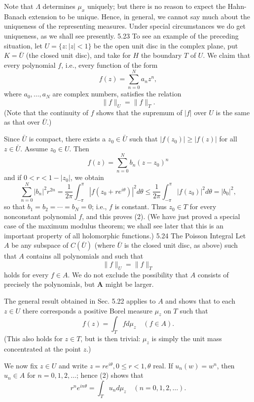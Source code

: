 Note that $\Lambda$ determines $\mu_x$ uniquely; but there is no reason to expect the Hahn-Banach extension to be unique. Hence, in general, we cannot say much about the uniqueness of the representing measures. Under special circumstances we do get uniqueness, as we shall see presently.
5.23 To see an example of the preceding situation, let $U=\{z:|z|<1\}$ be the open unit disc in the complex plane, put $K=\bar{U}$ (the closed unit disc), and take for $H$ the boundary $T$ of $U$. We claim that every polynomial $f$, i.e., every function of the form
$$
f(z)=\sum_{n=0}^N a_n z^n,
$$
where $a_0, \ldots, a_N$ are complex numbers, satisfies the relation
$$
\|f\|_U=\|f\|_T .
$$
(Note that the continuity of $f$ shows that the supremum of $|f|$ over $U$ is the same as that over $\bar{U}$.)

Since $\bar{U}$ is compact, there exists a $z_0 \in \bar{U}$ such that $\left|f\left(z_0\right)\right| \geq|f(z)|$ for all $z \in \bar{U}$. Assume $z_0 \in U$. Then
$$
f(z)=\sum_{n=0}^N b_n\left(z-z_0\right)^n
$$
and if $0<r<1-\left|z_0\right|$, we obtain
$$
\sum_{n=0}^N\left|b_n\right|^2 r^{2 n}=\frac{1}{2 \pi} \int_{-\pi}^\pi\left|f\left(z_0+r e^{i \theta}\right)\right|^2 d \theta \leq \frac{1}{2 \pi} \int_{-\pi}^\pi\left|f\left(z_0\right)\right|^2 d \theta=\left|b_0\right|^2,
$$
so that $b_1=b_2=\cdots=b_N=0$; i.e., $f$ is constant. Thus $z_0 \in T$ for every nonconstant polynomial $f$, and this proves (2).
(We have just proved a special case of the maximum modulus theorem; we shall see later that this is an important property of all holomorphic functions.)
5.24 The Poisson Integral Let $A$ be any subspace of $C(\bar{U})$ (where $\bar{U}$ is the closed unit disc, as above) such that $A$ contains all polynomials and such that
$$
\|f\|_U=\|f\|_T
$$
holds for every $f \in A$. We do not exclude the possibility that $A$ consists of precisely the polynomials, but $\boldsymbol{A}$ might be larger.

The general result obtained in Sec. 5.22 applies to $A$ and shows that to each $z \in U$ there corresponds a positive Borel measure $\mu_z$ on $T$ such that
$$
f(z)=\int_T f d \mu_z \quad(f \in A) .
$$
(This also holds for $z \in T$, but is then trivial: $\mu_z$ is simply the unit mass concentrated at the point $z$.)

We now fix $z \in U$ and write $z=r e^{i \theta}, 0 \leq r<1, \theta$ real.
If $u_n(w)=w^n$, then $u_n \in A$ for $n=0,1,2, \ldots$; hence (2) shows that
$$
r^n e^{i n \theta}=\int_T u_n d \mu_z \quad(n=0,1,2, \ldots) .
$$

